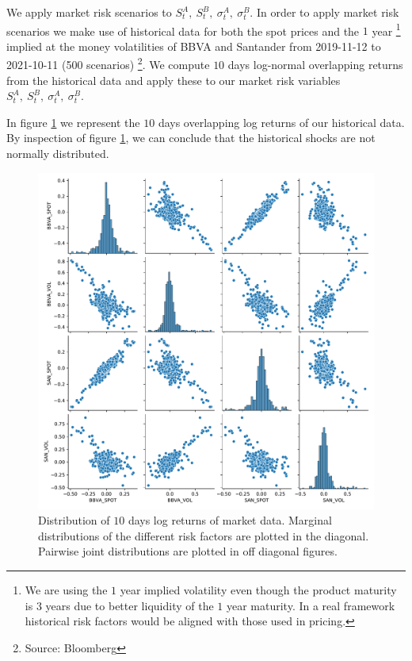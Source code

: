 We apply market risk scenarios to $S_t^A,\ S_t^B,\ \sigma_t^A,\ \sigma_t^B$.
In order to apply market risk scenarios we make use of historical data for both the spot prices and the $1$ year \footnote{We are using the $1$ year implied volatility even though the product maturity is $3$ years due to better liquidity of the $1$ year maturity. In a real framework historical risk factors would be aligned with those used in pricing.}   implied at the money volatilities of BBVA and Santander from 2019-11-12 to 2021-10-11 (500 scenarios) \footnote{Source: Bloomberg}. We compute $10$ days log-normal overlapping returns from the historical data and apply these to our market risk variables $S_t^A,\ S_t^B,\ \sigma_t^A,\ \sigma_t^B$. \jorge{$\checkmark$}


In figure \ref{fig:distrib_P} we represent the $10$ days overlapping log returns of our historical data. By inspection of figure \ref{fig:distrib_P}, we can conclude that the historical shocks are not normally distributed.  

\begin{figure}[H] 
\centering
\includegraphics[width=1.0\textwidth]{Figures/MarketRisk/histdata.pdf}
\caption{Distribution of $10$ days log returns of market data. Marginal distributions of the different risk factors are plotted in the diagonal. Pairwise joint distributions are plotted in off diagonal figures.}
\label{fig:distrib_P}
\end{figure}

